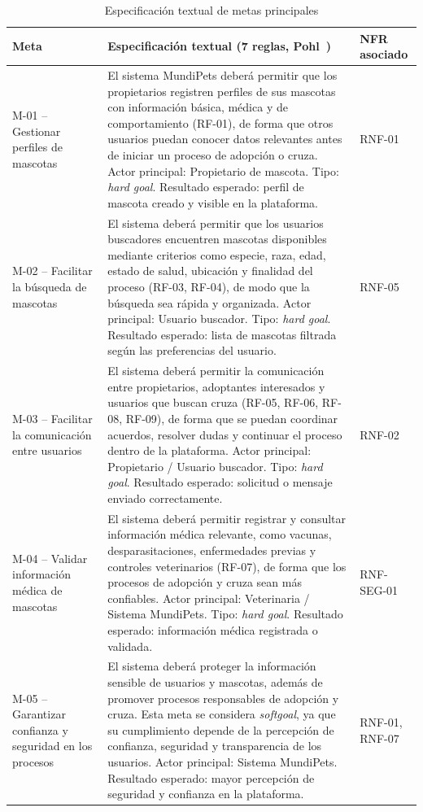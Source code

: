 \documentclass[journal,onecolumn]{IEEEtran}
\begin{document}
\begin{table}[H]
\caption{Especificación textual de metas principales}
\label{tab:metas}
\begin{tabularx}{\textwidth}{|l|X|l|}
\hline
\textbf{Meta} & \textbf{Especificación textual (7 reglas, Pohl~\cite{pohl2025})} & \textbf{NFR asociado} \\
\hline
M-01 -- Gestionar perfiles de mascotas &
El sistema MundiPets deberá permitir que los propietarios registren
perfiles de sus mascotas con información básica, médica y de
comportamiento (RF-01), de forma que otros usuarios puedan conocer datos
relevantes antes de iniciar un proceso de adopción o cruza. Actor
principal: Propietario de mascota. Tipo: \textit{hard goal}. Resultado
esperado: perfil de mascota creado y visible en la plataforma. &
RNF-01 \\
\hline
M-02 -- Facilitar la búsqueda de mascotas &
El sistema deberá permitir que los usuarios buscadores encuentren mascotas
disponibles mediante criterios como especie, raza, edad, estado de salud,
ubicación y finalidad del proceso (RF-03, RF-04), de modo que la búsqueda
sea rápida y organizada. Actor principal: Usuario buscador. Tipo:
\textit{hard goal}. Resultado esperado: lista de mascotas filtrada según
las preferencias del usuario. &
RNF-05 \\
\hline
M-03 -- Facilitar la comunicación entre usuarios &
El sistema deberá permitir la comunicación entre propietarios, adoptantes
interesados y usuarios que buscan cruza (RF-05, RF-06, RF-08, RF-09), de
forma que se puedan coordinar acuerdos, resolver dudas y continuar el
proceso dentro de la plataforma. Actor principal: Propietario / Usuario
buscador. Tipo: \textit{hard goal}. Resultado esperado: solicitud o mensaje
enviado correctamente. &
RNF-02 \\
\hline
M-04 -- Validar información médica de mascotas &
El sistema deberá permitir registrar y consultar información médica
relevante, como vacunas, desparasitaciones, enfermedades previas y
controles veterinarios (RF-07), de forma que los procesos de adopción y
cruza sean más confiables. Actor principal: Veterinaria / Sistema
MundiPets. Tipo: \textit{hard goal}. Resultado esperado: información médica
registrada o validada. &
RNF-SEG-01 \\
\hline
M-05 -- Garantizar confianza y seguridad en los procesos &
El sistema deberá proteger la información sensible de usuarios y mascotas,
además de promover procesos responsables de adopción y cruza. Esta meta se
considera \textit{softgoal}, ya que su cumplimiento depende de la
percepción de confianza, seguridad y transparencia de los usuarios. Actor
principal: Sistema MundiPets. Resultado esperado: mayor percepción de
seguridad y confianza en la plataforma. &
RNF-01, RNF-07 \\
\hline
\end{tabularx}
\end{table}
\end{document}

